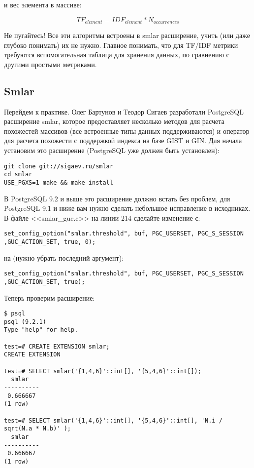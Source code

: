 и вес элемента в массиве:

\begin{equation}
 \label{eq:smlar6}
 TF_{element} = IDF_{element} * N_{occurrences}
\end{equation}

Не пугайтесь! Все эти алгоритмы встроены в smlar расширение, учить (или даже глубоко понимать) их не нужно. Главное понимать, что для TF/IDF метрики требуются вспомогательная таблица для хранения данных, по сравнению с другими простыми метриками.

\subsection{Smlar}

Перейдем к практике. Олег Бартунов и Теодор Сигаев разработали PostgreSQL расширение smlar, которое предоставляет несколько методов для расчета похожестей массивов (все встроенные типы данных поддерживаются) и оператор для расчета похожести с поддержкой индекса на базе GIST и GIN. Для начала установим это расширение (PostgreSQL уже должен быть установлен):

\begin{lstlisting}[label=lst:smlar1,caption=Установка smlar]
git clone git://sigaev.ru/smlar
cd smlar
USE_PGXS=1 make && make install
\end{lstlisting}

В PostgreSQL 9.2 и выше это расширение должно встать без проблем, для PostgreSQL 9.1 и ниже вам нужно сделать небольшое исправление в исходниках. В файле <<smlar\_guc.c>> на линии 214 сделайте изменение с:

\begin{lstlisting}[label=lst:smlar2,caption=Фикс для 9.1 и ниже]
set_config_option("smlar.threshold", buf, PGC_USERSET, PGC_S_SESSION ,GUC_ACTION_SET, true, 0);
\end{lstlisting}

на (нужно убрать последний аргумент):

\begin{lstlisting}[label=lst:smlar3,caption=Фикс для 9.1 и ниже]
set_config_option("smlar.threshold", buf, PGC_USERSET, PGC_S_SESSION ,GUC_ACTION_SET, true);
\end{lstlisting}

Теперь проверим расширение:

\begin{lstlisting}[label=lst:smlar4,caption=Проверка smlar]
$ psql
psql (9.2.1)
Type "help" for help.

test=# CREATE EXTENSION smlar;
CREATE EXTENSION

test=# SELECT smlar('{1,4,6}'::int[], '{5,4,6}'::int[]);
  smlar  
----------
 0.666667
(1 row)

test=# SELECT smlar('{1,4,6}'::int[], '{5,4,6}'::int[], 'N.i / sqrt(N.a * N.b)' );
  smlar  
----------
 0.666667
(1 row)
\end{lstlisting}

